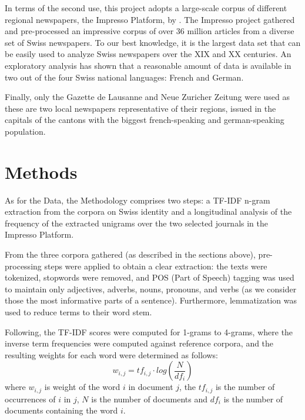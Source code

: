 \documentclass[11pt]{article}
\begin{document}
In terms of the second use, this project adopts a large-scale corpus of different regional newspapers, the Impresso Platform, by \cite{Ehrmann2020LanguageRF}. The Impresso project gathered and pre-processed an impressive corpus of over 36 million articles from a diverse set of Swiss newspapers. To our best knowledge, it is the largest data set that can be easily used to analyze Swiss newspapers over the XIX and XX centuries. An exploratory analysis has shown that a reasonable amount of data is available in two out of the four Swiss national languages: French and German.\par
Finally, only the Gazette de Lausanne and Neue Zuricher Zeitung were used as these are two local newspapers representative of their regions, issued in the capitals of the cantons with the biggest french-speaking and german-speaking population. 


\section{Methods}
As for the Data, the Methodology comprises two steps: a TF-IDF n-gram extraction from the corpora on Swiss identity and a longitudinal analysis of the frequency of the extracted unigrams over the two selected journals in the Impresso Platform. \par

From the three corpora gathered (as described in the sections above), pre-processing steps were applied to obtain a clear extraction: the texts were tokenized, stopwords were removed, and POS (Part of Speech) tagging was used to maintain only adjectives, adverbs, nouns, pronouns, and verbs (as we consider those the most informative parts of a sentence). Furthermore, lemmatization was used to reduce terms to their word stem.\par
Following, the TF-IDF scores were computed for 1-grams to 4-grams, where the inverse term frequencies were computed against reference corpora, and the resulting weights for each word were determined as follows:
\[w_{i,j} = tf_{i,j} \cdot log(\frac{N}{df_{i}})\]
where $w_{i,j}$ is weight of the word $i$ in document $j$, the $tf_{i,j}$ is the number of occurrences of $i$ in $j$, $N$ is the number of documents and $df_{i}$ is the number of documents containing the word $i$. \par
\end{document}
